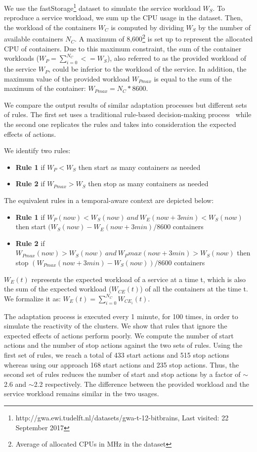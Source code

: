 We use the fastStorage\footnote{http://gwa.ewi.tudelft.nl/datasets/gwa-t-12-bitbrains, Last visited: 22 September 2017} dataset\cite{DBLP:conf/ccgrid/ShenBI15} to simulate the service workload  $W_S$.
To reproduce a service workload, we sum up the CPU usage in the dataset.
Then, the workload of the containers $W_C$ is computed by dividing $W_S$ by the number of available containers $N_C$.
A maximum of 8,600\footnote{Average of allocated CPUs in MHz in the dataset} is set up to represent the allocated CPU of containers.
Due to this maximum constraint, the sum of the container workloads ($W_P = \sum_{i=0}^{N_C} <= W_S$), also referred to as the provided workload of the service $W_P$, could be inferior to the workload of the service.
In addition, the maximum value of the provided workload $W_{Pmax}$ is equal to the sum of the maximum of the container: $W_{Pmax} = N_C * 8600$.

We compare the output results of similar adaptation processes but different sets of rules.
The first set uses a traditional rule-based decision-making process~\cite{aamodt1994case,anicic2010rule} while the second one replicates the rules and takes into consideration the expected effects of actions.

We identify two rules:
\begin{itemize}
	\item \textbf{Rule 1} if $W_P < W_S$  then start as many containers as needed
	\item \textbf{Rule 2} if $W_{Pmax} > W_S$ then stop as many containers as needed
\end{itemize}

The equivalent rules in a temporal-aware context are depicted below:

\begin{itemize}
	\item \textbf{Rule 1} if $W_P(now) < W_S(now)~and~W_E(now+3min) < W_S(now)$  then start $(W_S(now) - W_E(now+3min) / 8600$ containers
	\item \textbf{Rule 2} if $W_{Pmax}(now) > W_S(now)~and~W_Pmax(now+3min) > W_S(now)$ then stop $(W_{Pmax}(now+3min) - W_S(now)) / 8600$ containers
\end{itemize}

$W_E(t)$ represents the expected workload of a service at a time t, which is also the sum of the expected workload ($W_{CE}(t)$) of all the containers at the time t.
We formalize it as: $W_E(t) = \sum_{i=0}^{N_C}W_{CE_i}(t)$.

The adaptation process is executed every 1 minute, for 100 times, in order to simulate the reactivity of the clusters. 
We show that rules that ignore the expected effects of actions perform poorly.
We compute the number of start actions and the number of stop actions against the two sets of rules. 
Using the first set of rules, we reach a total of 433 start actions and 515 stop actions whereas using our approach 168 start actions and 235 stop actions. 
Thus, the second set of rules reduces the number of start and stop actions by a factor of $\sim$2.6 and $\sim$2.2 respectively. 
The difference between the provided workload and the service workload remains similar in the two usages.


